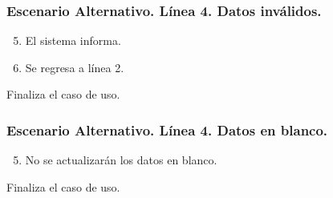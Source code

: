 \subsubsection{Escenario Alternativo. L\'{i}nea 4. Datos inv\'{a}lidos.}
\begin{enumerate}
\setcounter{enumi}{4}
\item El sistema informa.
\item Se regresa a l\'{i}nea 2.
\end{enumerate}
Finaliza el caso de uso.
\subsubsection{Escenario Alternativo. L\'{i}nea 4. Datos en blanco.}
\begin{enumerate}
\setcounter{enumi}{4}
\item No se actualizar\'{a}n los datos en blanco.
\end{enumerate}
Finaliza el caso de uso.
